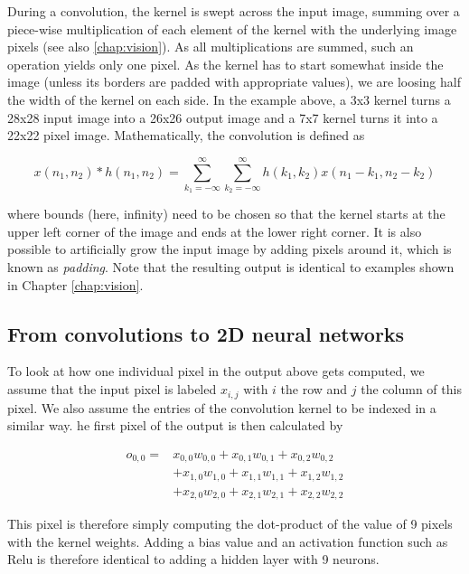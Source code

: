 During a convolution, the kernel is swept across the input image, summing over a piece-wise multiplication of each element of the kernel with the underlying image pixels (see also \cref{chap:vision}). As all multiplications are summed, such an operation yields only one pixel. As the kernel has to start somewhat inside the image (unless its borders are padded with appropriate values), we are loosing half the width of the kernel on each side. In the example above, a 3x3 kernel turns a 28x28 input image into a 26x26 output image and a 7x7 kernel turns it into a 22x22 pixel image. Mathematically, the convolution is defined as

\begin{equation}
x(n_1,n_2)*h(n_1,n_2)=\sum_{k_1=-\infty}^{\infty} \sum_{k_2=-\infty}^{\infty} h(k_1,k_2)x(n_1-k_1,n_2-k_2)
\end{equation}

where bounds (here, infinity) need to be chosen so that the kernel starts at the upper left corner of the image and ends at the lower right corner. It is also possible to artificially grow the input image by adding pixels around it, which is known as \textsl{padding}. Note that the resulting output is identical to examples shown in Chapter \ref{chap:vision}.

\subsection{From convolutions to 2D neural networks}

To look at how one individual pixel in the output above gets computed, we assume that the input pixel is labeled $x_{i,j}$ with $i$ the row and $j$ the column of this pixel. We also assume the entries of the convolution kernel to be indexed in a similar way. he first pixel of the output is then calculated by

\begin{eqnarray}
o_{0,0}=&x_{0,0}w_{0,0}+x_{0,1}w_{0,1}+x_{0,2}w_{0,2}\\
\nonumber
		&+x_{1,0}w_{1,0}+x_{1,1}w_{1,1}+x_{1,2}w_{1,2}\\
\nonumber
		&+x_{2,0}w_{2,0}+x_{2,1}w_{2,1}+x_{2,2}w_{2,2}
\end{eqnarray}

This pixel is therefore simply computing the dot-product of the value of 9 pixels with the kernel weights. Adding a bias value and an activation function such as Relu is therefore identical to adding a hidden layer with 9 neurons. 

